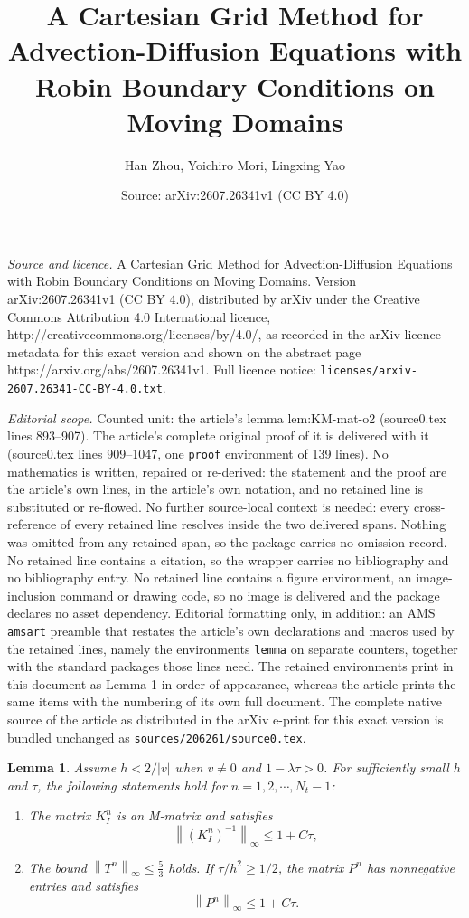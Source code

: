 \documentclass[10pt,a4paper]{amsart}
\title{A Cartesian Grid Method for Advection-Diffusion Equations with Robin Boundary Conditions on Moving Domains}
\author{Han Zhou, Yoichiro Mori, Lingxing Yao}
\date{Source: arXiv:2607.26341v1 (CC BY 4.0)}
\newtheorem{lemma}{Lemma}
\newcommand{\abs}[1]{\left\lvert #1 \right\rvert}
\newcommand{\norm}[1]{\left\lVert #1 \right\rVert}
\begin{document}
\maketitle

\noindent\emph{Source and licence.} A Cartesian Grid Method for Advection-Diffusion Equations with Robin Boundary Conditions on Moving Domains. Version arXiv:2607.26341v1 (CC BY 4.0), distributed by arXiv under the Creative Commons Attribution 4.0 International licence, http://creativecommons.org/licenses/by/4.0/, as recorded in the arXiv licence metadata for this exact version and shown on the abstract page https://arxiv.org/abs/2607.26341v1. Full licence notice: \texttt{licenses/arxiv-2607.26341-CC-BY-4.0.txt}.\par\smallskip

\noindent\textit{Editorial scope.} Counted unit: the article's lemma lem:KM-mat-o2 (source0.tex lines 893--907). The article's complete original proof of it is delivered with it (source0.tex lines 909--1047, one \texttt{proof} environment of 139 lines). No mathematics is written, repaired or re-derived: the statement and the proof are the article's own lines, in the article's own notation, and no retained line is substituted or re-flowed.  No further source-local context is needed: every cross-reference of every retained line resolves inside the two delivered spans.  Nothing was omitted from any retained span, so the package carries no omission record.  No retained line contains a citation, so the wrapper carries no bibliography and no bibliography entry.  No retained line contains a figure environment, an image-inclusion command or drawing code, so no image is delivered and the package declares no asset dependency.  Editorial formatting only, in addition: an AMS \texttt{amsart} preamble that restates the article's own declarations and macros used by the retained lines, namely the environments \texttt{lemma} on separate counters, together with the standard packages those lines need.  The retained environments print in this document as Lemma 1 in order of appearance, whereas the article prints the same items with the numbering of its own full document.  The complete native source of the article as distributed in the arXiv e-print for this exact version is bundled unchanged as \texttt{sources/206261/source0.tex}.
\begin{lemma}\label{lem:KM-mat-o2}
Assume $h<2/\abs{v}$ when $v\ne0$ and $1-\lambda\tau>0$.
For sufficiently small $h$ and $\tau$, the following
statements hold for $n = 1,2,\cdots, N_t-1$:
\begin{enumerate}
    \item The matrix $K_I^n$ is an M-matrix and satisfies
\begin{equation}
    \norm{(K_I^n)^{-1}}_\infty \le 1+C\tau,
\end{equation}
    \item The bound $\norm{T^n}_\infty \le \frac{5}{3}$ holds. If $\tau / h^2 \ge 1/2$, the matrix $P^n$ has nonnegative entries and satisfies
\begin{equation}
    \norm{P^n}_\infty \le 1+C\tau.
\end{equation}
\end{enumerate}
\end{lemma}
\end{document}
